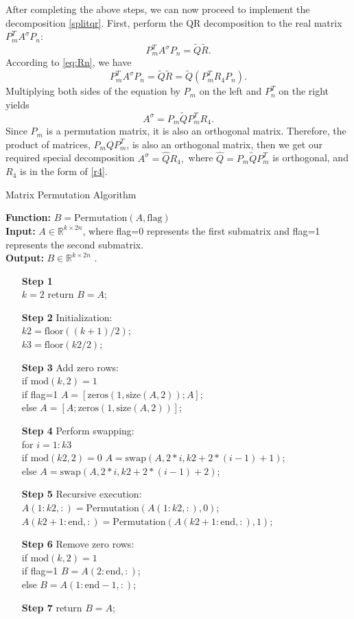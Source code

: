 \documentclass[5p]{elsarticle}
\numberwithin{equation}{section}
\begin{document}
After completing the above steps, we can now proceed to implement the decomposition \eqref{splitqr}.
First, perform the QR decomposition to the real matrix $P_m^TA^\sigma P_{n}$:
\[P_m^TA^\sigma P_n = \tilde{Q}\tilde{R}.\]
According to \eqref{eq:Rn}, we have
\[P_m^TA^\sigma P_n = \tilde{Q}\tilde{R} = \tilde{Q}(P_m^TR_4P_n).\]
Multiplying both sides of the equation by $P_m$ on the left and $P_n^T$ on the right yields
\[A^\sigma=P_m\tilde{Q}P_m^T R_4.\]
Since $P_m$ is a permutation matrix, it is also an orthogonal matrix. Therefore, the product of matrices, $P_mQP_m^T$, is also an orthogonal matrix, then we get our required special decomposition $A^\sigma=\hat{Q}R_4,$ where $\hat{Q}=P_m\tilde{Q}P_m^T$ is orthogonal, and $R_4$ is in the form of \eqref{r4}.

\begin{algorithm}[htbp]
    \caption{Matrix Permutation Algorithm} \label{alg:Permutation}
    \textbf{Function:} $B=\text{Permutation}(A,\text{flag})$\\	
    \textbf{Input:}  $ A \in \mathbb{R}^{k \times 2n}$, where flag=0 represents the first submatrix and flag=1 represents the second submatrix.\\
    \textbf{Output:} $B \in \mathbb{R}^{k \times 2n}$ .
\begin{itemize}
    \item[\textbf{Step 1}]\\
         $k=2$ \quad return $B=A$;
    \item[\textbf{Step 2}] Initialization:\\
        $k2 = \text{floor}((k+1)/2)$;\\
        $k3 = \text{floor}(k2/2)$;
    \item[\textbf{Step 3}] Add zero rows:\\
        if $\text{mod}(k, 2)=1$ \\
        if flag=1 \quad $A = [\text{zeros}(1, \text{size}(A, 2)); A]$;\\
        else  $A = [A; \text{zeros}(1, \text{size}(A, 2))]$;
    \item[\textbf{Step 4}] Perform swapping:\\
       for $i=1:k3$\\
       if $\text{mod}(k2, 2)=0$ \quad
        $A= \text{swap}(A,2*i,k2+2*(i-1)+1)$;\\
       else
        $A= \text{swap}(A,2*i,k2+2*(i-1)+2)$;
    \item[\textbf{Step 5}] Recursive execution:\\
       $A(1:k2, :) = \text{Permutation}(A(1:k2, :), 0)$;\\
       $A(k2+1:\text{end}, :) = \text{Permutation}(A(k2+1:\text{end}, :), 1)$;
    \item[\textbf{Step 6}] Remove zero rows: \\
       if $\text{mod}(k, 2)=1$ \\
       if flag=1 \quad $B = A(2:\text{end}, :)$;\\
       else $B = A(1:\text{end}-1, :)$;
    \item[\textbf{Step 7}] return $B=A$;
\end{itemize}
\end{algorithm}
\end{document}
